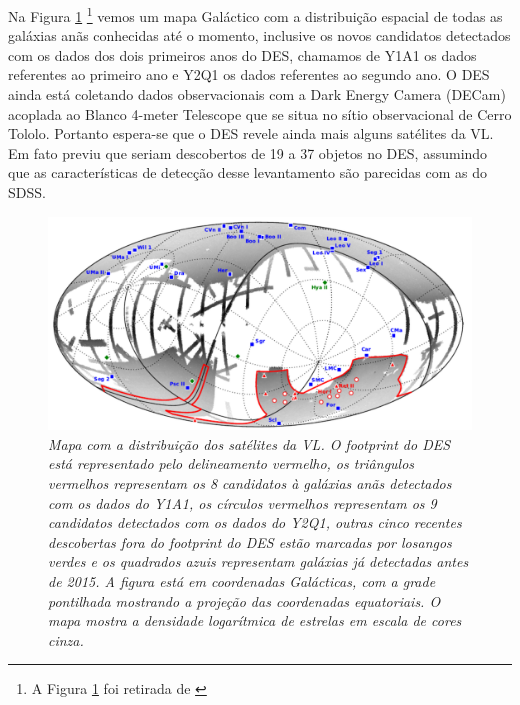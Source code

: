 \documentclass[
	12pt,				%
	openany,			%
	oneside,			%
	a4paper,			%
	english,			%
	brazil				%
	]{abntex2}
\begin{document}
Na Figura \ref{fig:dwarfcenso} \footnote{A Figura \ref{fig:dwarfcenso} foi retirada de \cite{2015ApJ...807...50B,2015arXiv150803622T}}  vemos um  mapa Galáctico com a distribuição espacial de todas as galáxias anãs conhecidas até o momento, inclusive os novos candidatos detectados com os dados dos dois primeiros anos do DES, chamamos de  Y1A1 os dados referentes ao primeiro ano e Y2Q1 os dados referentes ao segundo ano. O DES  ainda está coletando dados observacionais com a Dark Energy Camera (DECam) acoplada ao Blanco 4-meter Telescope que se  situa no sítio observacional de Cerro Tololo. Portanto espera-se que o DES revele ainda mais alguns satélites da VL. Em fato \cite{2008ApJ...688..277T} previu que seriam descobertos de 19 a 37 objetos no DES, assumindo que as características de detecção desse levantamento são parecidas com as do SDSS.

\begin{figure}[h]
\begin{center}
\includegraphics[width=12cm]{figuras/censodg.pdf}
\caption{\textit{Mapa com a distribuição dos satélites da VL. O footprint do DES está representado pelo delineamento vermelho, os triângulos vermelhos \cite{2012AJ....144...76W} representam os 8 candidatos à galáxias anãs detectados com os dados do Y1A1, os círculos vermelhos \cite{2015ApJ...807...50B,2015arXiv150803622T} representam os 9 candidatos detectados com os dados do Y2Q1, outras cinco recentes descobertas fora do footprint do DES estão marcadas por losangos verdes \cite{2015ApJ...802L..18L,2015ApJ...804L...5M, 2015ApJ...804L..44K,2015ApJ...813...44L} e os quadrados azuis \cite{2012AJ....144....4M} representam galáxias já detectadas antes de 2015. A figura está em coordenadas Galácticas, com a grade pontilhada mostrando a projeção das coordenadas equatoriais. O mapa mostra a densidade logarítmica de estrelas em escala de cores cinza.}}
\label{fig:dwarfcenso}
\end{center}
\end{figure}
\vspace{0.5cm}
\end{document}
